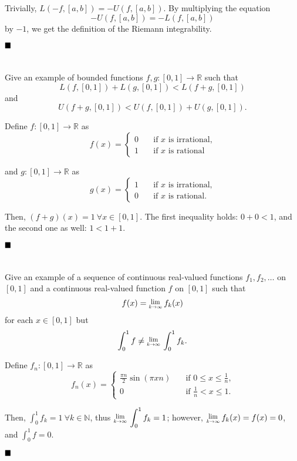\documentclass[11pt, a4paper, tikz]{article}
\newcommand{\centsection}[1]{
	\section*{\centering{#1}}
}
\renewcommand{\qed}{\hfill\blacksquare}
\newcommand{\Lim}[1]{\raisebox{0.5ex}{\scalebox{0.8}{$\displaystyle \lim_{#1}\;$}}}
\newcommand{\Int}[2]{\displaystyle \int_{#1}^{#2}}
\newcommand{\naturals}{
	\ensuremath{\mathbb{N}}
}
\newcommand{\reals}{
	\ensuremath{\mathbb{R}}
}
\begin{document}
	Trivially, $L(-f, [a,b]) = -U(f, [a,b])$. By multiplying the equation \[-U(f,[a,b]) = -L(f,[a,b])\] by $-1$, we get the definition of the Riemann integrability.
	
	$\qed$
	
	\centsection{Exercise 4}
	
	\begin{formulationBox}
		Give an example of bounded functions $f, g:[0,1]\rightarrow\reals$ such that \[L(f, [0,1]) + L(g, [0,1]) < L(f+g,[0,1])\] and \[U(f+g,[0,1]) < U(f, [0,1]) + U(g, [0,1]).\]
	\end{formulationBox}
	
	Define $f:[0,1]\rightarrow\reals$ as
	\[
		f(x) =
		\begin{cases}
			0 &\quad \textrm{if $x$ is irrational,}\\
			1 &\quad \textrm{if $x$ is rational}
		\end{cases}
	\]
	
	and $g:[0,1]\rightarrow\reals$ as
	\[
		g(x) =
		\begin{cases}
			1 &\quad \textrm{if $x$ is irrational,}\\
			0 &\quad \textrm{if $x$ is rational.}
		\end{cases}
	\]
	
	Then, $(f+g)(x) = 1\ \forall x\in[0,1]$. The first inequality holds: $0 + 0 < 1$, and the second one as well: $1 < 1 + 1$.
	
	$\qed$
	
	\centsection{Exercise 5}
	
	\begin{formulationBox}
		Give an example of a sequence of continuous real-valued functions $f_1, f_2, \dots$ on $[0,1]$ and a continuous real-valued function $f$ on $[0,1]$ such that \[f(x)=\Lim{k\rightarrow\infty}f_k(x)\] for each $x\in[0,1]$ but \[\Int{0}{1}f \neq \Lim{k\rightarrow\infty}\Int{0}{1}f_k.\]
	\end{formulationBox}
	
	Define $f_n:[0,1]\rightarrow\reals$ as
	\[
		f_n(x) =
		\begin{cases}
			\frac{\pi n}{2}\sin(\pi xn) &\quad \textrm{if $0\leq x\leq \frac{1}{n}$,}\\
			0 &\quad \textrm{if $\frac{1}{n} < x \leq 1$.}
		\end{cases}
	\]
	
	Then, $\Int{0}{1}f_k = 1\ \forall k\in\naturals$, thus $\Lim{k\rightarrow\infty}\Int{0}{1}f_k = 1$; however, $\Lim{k\rightarrow\infty}f_k(x) = f(x) = 0$, and $\Int{0}{1}f = 0$.
	
	$\qed$
\end{document}
